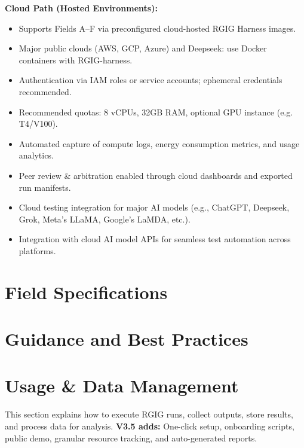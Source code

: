 \documentclass[11pt]{article}
\makeatletter
\newcommand{\inputnolabel}[1]{%
  \let\saved@label\label
  \let\label\@gobble
  \let\label\saved@label
}
\makeatother
\begin{document}
\textbf{Cloud Path (Hosted Environments):}
\begin{itemize}
  \item Supports Fields A--F via preconfigured cloud-hosted RGIG Harness images.
  \item Major public clouds (AWS, GCP, Azure) and Deepseek: use Docker containers with RGIG-harness.
  \item Authentication via IAM roles or service accounts; ephemeral credentials recommended.
  \item Recommended quotas: 8 vCPUs, 32GB RAM, optional GPU instance (e.g. T4/V100).
  \item Automated capture of compute logs, energy consumption metrics, and usage analytics.
  \item Peer review \& arbitration enabled through cloud dashboards and exported run manifests.
  \item Cloud testing integration for major AI models (e.g., ChatGPT, Deepseek, Grok, Meta's LLaMA, Google's LaMDA, etc.).
  \item Integration with cloud AI model APIs for seamless test automation across platforms.
\end{itemize}

\section*{Field Specifications}
\inputnolabel{fieldA.tex} %
\inputnolabel{fieldB.tex} %
\inputnolabel{fieldC.tex} %
\inputnolabel{fieldD.tex} %
\inputnolabel{fieldE.tex} %
\inputnolabel{fieldF.tex} %
\inputnolabel{fieldG.tex} %

\section*{Guidance and Best Practices}
\inputnolabel{guidance.tex}

\section*{Usage \& Data Management}
This section explains how to execute RGIG runs, collect outputs, store results, and process data for analysis.\newline
\textbf{V3.5 adds:} One-click setup, onboarding scripts, public demo, granular resource tracking, and auto-generated reports.
\end{document}
